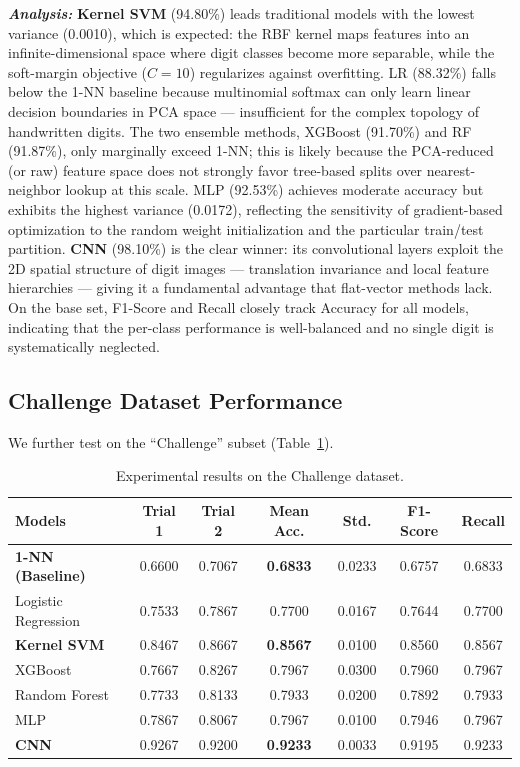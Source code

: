 \documentclass[11pt,a4paper]{article}
\begin{document}
\noindent \textbf{\textit{Analysis:}}
\textbf{Kernel SVM} (94.80\%) leads traditional models with the lowest variance (0.0010), which is expected: the RBF kernel maps features into an infinite-dimensional space where digit classes become more separable, while the soft-margin objective ($C\!=\!10$) regularizes against overfitting. LR (88.32\%) falls below the 1-NN baseline because multinomial softmax can only learn linear decision boundaries in PCA space — insufficient for the complex topology of handwritten digits. The two ensemble methods, XGBoost (91.70\%) and RF (91.87\%), only marginally exceed 1-NN; this is likely because the PCA-reduced (or raw) feature space does not strongly favor tree-based splits over nearest-neighbor lookup at this scale. MLP (92.53\%) achieves moderate accuracy but exhibits the highest variance (0.0172), reflecting the sensitivity of gradient-based optimization to the random weight initialization and the particular train/test partition. \textbf{CNN} (98.10\%) is the clear winner: its convolutional layers exploit the 2D spatial structure of digit images — translation invariance and local feature hierarchies — giving it a fundamental advantage that flat-vector methods lack. On the base set, F1-Score and Recall closely track Accuracy for all models, indicating that the per-class performance is well-balanced and no single digit is systematically neglected.

\subsection{Challenge Dataset Performance}

We further test on the ``Challenge'' subset (Table~\ref{tab:challenge_results}).

\begin{table}[H]
    \centering
    \renewcommand{\arraystretch}{1.3}
    \small
    \begin{tabular}{lcccccc}
        \toprule
        \textbf{Models} & \textbf{Trial 1} & \textbf{Trial 2} & \textbf{Mean Acc.} & \textbf{Std.} & \textbf{F1-Score} & \textbf{Recall} \\
        \midrule
        \textbf{1-NN (Baseline)} & 0.6600 & 0.7067 & \textbf{0.6833} & 0.0233 & 0.6757 & 0.6833 \\
        \midrule
        Logistic Regression & 0.7533 & 0.7867 & 0.7700 & 0.0167 & 0.7644 & 0.7700 \\
        \textbf{Kernel SVM} & 0.8467 & 0.8667 & \textbf{0.8567} & 0.0100 & 0.8560 & 0.8567 \\
        XGBoost & 0.7667 & 0.8267 & 0.7967 & 0.0300 & 0.7960 & 0.7967 \\
        Random Forest & 0.7733 & 0.8133 & 0.7933 & 0.0200 & 0.7892 & 0.7933 \\
        MLP & 0.7867 & 0.8067 & 0.7967 & 0.0100 & 0.7946 & 0.7967 \\
        \textbf{CNN} & 0.9267 & 0.9200 & \textbf{0.9233} & 0.0033 & 0.9195 & 0.9233 \\
        \bottomrule
    \end{tabular}
    \caption{Experimental results on the Challenge dataset.}
    \label{tab:challenge_results}
\end{table}
\end{document}
